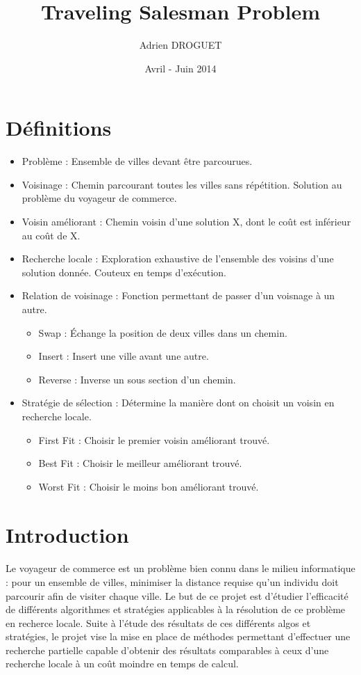 \documentclass[a4paper,10pt]{report}
\title{Traveling Salesman Problem}
\author{Adrien DROGUET}
\date{Avril - Juin 2014}
\begin{document}
\maketitle

\tableofcontents
\pagebreak

\section{Définitions}
\begin{itemize}
 \item Problème : Ensemble de villes devant être parcourues.
 \item Voisinage : Chemin parcourant toutes les villes sans répétition. Solution au problème du voyageur de commerce.
 \item Voisin améliorant : Chemin voisin d'une solution X, dont le coût est inférieur au coût de X.
 \item Recherche locale : Exploration exhaustive de l'ensemble des voisins d'une solution donnée.
 Couteux en temps d'exécution.
 \item Relation de voisinage : Fonction permettant de passer d'un voisnage à un autre.
 \begin{itemize}
  \item Swap : Échange la position de deux villes dans un chemin.
  \item Insert : Insert une ville avant une autre.
  \item Reverse : Inverse un sous section d'un chemin.
 \end{itemize}
 \item Stratégie de sélection : Détermine la manière dont on choisit un voisin en recherche locale.
 \begin{itemize}
  \item First Fit : Choisir le premier voisin améliorant trouvé.
  \item Best Fit : Choisir le meilleur améliorant trouvé.
  \item Worst Fit : Choisir le moins bon améliorant trouvé.
 \end{itemize}
\end{itemize}


\section{Introduction}

\paragraph{} %
  Le voyageur de commerce est un problème bien connu dans le milieu informatique : pour un ensemble de villes,
minimiser la distance requise qu'un individu doit parcourir afin de visiter chaque ville. Le but de ce projet
est d'étudier l'efficacité de différents algorithmes et stratégies applicables à la résolution de ce problème
en recherce locale. Suite à l'étude des résultats de ces différents algos et stratégies, le projet vise la mise
en place de méthodes permettant d'effectuer une recherche partielle capable d'obtenir des résultats comparables
à ceux d'une recherche locale à un coût moindre en temps de calcul.
\end{document}
